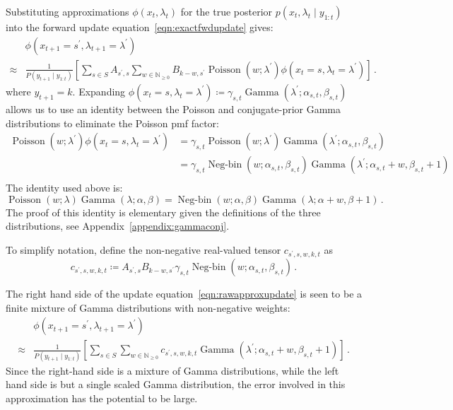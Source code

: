 \documentclass[twoside, 11pt]{article}
\DeclareMathOperator*{\gammad}{Gamma}
\DeclareMathOperator*{\poissond}{Poisson}
\DeclareMathOperator*{\negbind}{Neg-bin}
\newcommand{\nonnegint}[0] {\mathbb{N}_{\geq 0}}
\begin{document}
Substituting approximations $\phi(x_t, \lambda_t)$ for the true posterior $p(x_t, \lambda_t \mid y_{1:t})$ into the forward update equation~\ref{eqn:exactfwdupdate} gives:
\begin{align}
& \phi(x_{t+1}=s^{\prime}, \lambda_{t+1}=\lambda^{\prime}) \nonumber \\
\approx &
\frac{1}{P(y_{t+1} \mid y_{1:t})}
\left[
\sum_{s \in S}
A_{s^{\prime}, s}
\sum_{w \in \nonnegint}
B_{k-w,s^{\prime}} \poissond(w ; \lambda^{\prime})
\phi(x_t=s, \lambda_t=\lambda^{\prime})
\right]  \, . \label{eqn:rawapproxupdate}
\end{align}
where $y_{t+1} = k$.
Expanding $\phi(x_t=s, \lambda_t=\lambda^{\prime}) \coloneqq \gamma_{s,t} \gammad(\lambda^{\prime} ; \alpha_{s,t}, \beta_{s,t})$ allows us to use an identity between the Poisson and conjugate-prior Gamma distributions to eliminate the Poisson pmf factor:
\begin{align}
\poissond(w ; \lambda^{\prime}) \phi(x_t=s, \lambda_t=\lambda^{\prime}) & = 
\gamma_{s,t} \poissond(w ; \lambda^{\prime}) \gammad(\lambda^{\prime} ; \alpha_{s,t}, \beta_{s,t}) \nonumber \\
& = \gamma_{s,t} \negbind(w ; \alpha_{s,t}, \beta_{s,t}) \gammad(\lambda^{\prime} ; \alpha_{s,t} + w, \beta_{s,t} + 1) \nonumber \\
\end{align}
The identity used above is:
\begin{equation}
\poissond(w ; \lambda) \gammad(\lambda ; \alpha, \beta) = 
\negbind(w ; \alpha, \beta)
\gammad(\lambda ; \alpha + w, \beta + 1) \, . \nonumber
\end{equation}
The proof of this identity is elementary given the definitions of the three distributions, see Appendix~\ref{appendix:gammaconj}.

To simplify notation, define the non-negative real-valued tensor $c_{s^{\prime}, s, w, k, t}$ as
\begin{equation}
c_{s^{\prime}, s, w, k, t} \coloneqq A_{s^{\prime}, s} B_{k-w, s^{\prime}} \gamma_{s,t} \negbind(w ; \alpha_{s,t}, \beta_{s,t}) \, .
\end{equation}

The right hand side of the update equation~\ref{eqn:rawapproxupdate} is seen to be a finite mixture of Gamma distributions with non-negative weights:
\begin{align}
& \phi(x_{t+1}=s^{\prime}, \lambda_{t+1}=\lambda^{\prime}) \nonumber \\
\approx &
\frac{1}{P(y_{t+1} \mid y_{1:t})}
\left[
\sum_{s \in S}
\sum_{w \in \nonnegint}
c_{s^{\prime}, s, w, k, t}
\gammad(\lambda^{\prime} ; \alpha_{s,t} + w, \beta_{s,t} + 1)
\right]  \, .
\end{align}
Since the right-hand side is a mixture of Gamma distributions, while the left hand side is but a single scaled Gamma distribution, the error involved in this approximation has the potential to be large.
\end{document}
